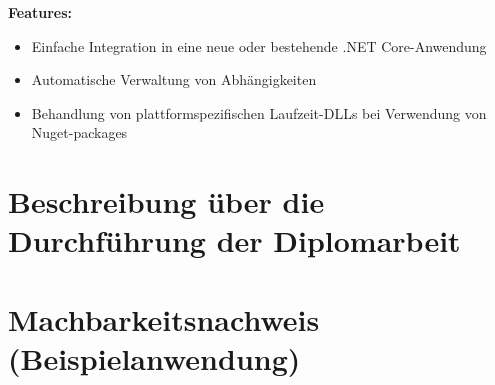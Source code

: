 \textbf{Features:}
\begin{itemize}
    \item Einfache Integration in eine neue oder bestehende .NET Core-Anwendung
    \item Automatische Verwaltung von Abhängigkeiten
    \item Behandlung von plattformspezifischen Laufzeit-DLLs bei Verwendung von Nuget-packages
\end{itemize}

\newpage
\section{Beschreibung über die Durchführung der Diplomarbeit}



\newpage
\section{Machbarkeitsnachweis (Beispielanwendung)}
